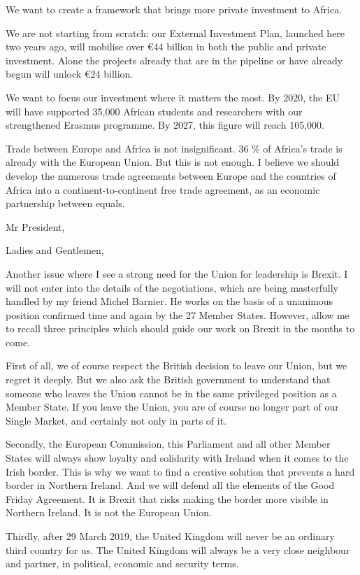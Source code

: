 \documentclass[a4paper,11pt]{article}
\begin{document}
We want to create a framework that brings more private investment to Africa.

We are not starting from scratch: our External Investment Plan, launched here two years ago, will mobilise over \euro44 billion in both the public and private investment. Alone the projects already that are in the pipeline or have already begun will unlock \euro24 billion.

We want to focus our investment where it matters the most. By 2020, the EU will have supported 35,000 African students and researchers with our strengthened Erasmus programme. By 2027, this figure will reach 105,000.

Trade between Europe and Africa is not insignificant. 36 \% of Africa's trade is already with the European Union. But this is not enough. I believe we should develop the numerous trade agreements between Europe and the countries of Africa into a continent-to-continent free trade agreement, as an economic partnership between equals.

 

Mr President,

Ladies and Gentlemen,

Another issue where I see a strong need for the Union for leadership is Brexit. I will not enter into the details of the negotiations, which are being masterfully handled by my friend Michel Barnier. He works on the basis of a unanimous position confirmed time and again by the 27 Member States. However, allow me to recall three principles which should guide our work on Brexit in the months to come.

First of all, we of course respect the British decision to leave our Union, but we regret it deeply. But we also ask the British government to understand that someone who leaves the Union cannot be in the same privileged position as a Member State. If you leave the Union, you are of course no longer part of our Single Market, and certainly not only in parts of it.

Secondly, the European Commission, this Parliament and all other Member States will always show loyalty and solidarity with Ireland when it comes to the Irish border. This is why we want to find a creative solution that prevents a hard border in Northern Ireland. And we will defend all the elements of the Good Friday Agreement. It is Brexit that risks making the border more visible in Northern Ireland. It is not the European Union.

Thirdly, after 29 March 2019, the United Kingdom will never be an ordinary third country for us. The United Kingdom will always be a very close neighbour and partner, in political, economic and security terms.
\end{document}
